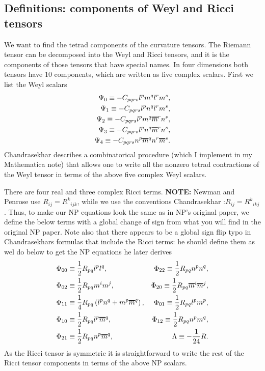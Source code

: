 \documentclass[12pt]{report}
\newcommand*\oline[1]{%
   \vbox{%
     \hrule height 1pt%
     \kern0.25ex%
     \hbox{%
       \ifmmode#1\else\ensuremath{#1}\fi%
     }
   }
}
\begin{document}
\subsection{Definitions: components of Weyl and Ricci tensors}
\label{sec:def_Weyl_Ricci_tensors}
	We want to find the tetrad components of the curvature tensors. The
Riemann tensor can be decomposed into the Weyl and Ricci tensors, and it
is the components of those tensors that have special names. In four dimensions
both tensors have 10 components, which are written as five complex scalars.
First we list the Weyl scalars 
\begin{align}
\begin{aligned}
	\Psi_0
	\equiv
	-C_{pqrs}l^pm^ql^rm^s
	, \\
	\Psi_1
	\equiv
	-C_{pqrs}l^pn^ql^rm^s
	, \\
	\Psi_2
	\equiv
	-C_{pqrs}l^pm^q\oline{m}^rn^s
	, \\
	\Psi_3
	\equiv
	-C_{pqrs}l^pn^q\oline{m}^rn^s
	, \\
	\Psi_4
	\equiv
	-C_{pqrs}n^p\oline{m}^qn^r\oline{m}^s
	.
\end{aligned}
\end{align} 
	Chandrasekhar \cite{Chandrasekhar_bh_book}
describes a combinatorical procedure
(which I implement in my Mathematica note) that allows one to
write all the nonzero tetrad contractions of the Weyl
tensor in terms of the above five complex Weyl scalars.

	There are four real and three complex
Ricci terms. {\bf NOTE:}
Newman and Penrose \cite{Newman_Penrose_paper} use
$R_{ij}=R^k{}_{ijk}$, while we use the conventions Chandrasekhar
\cite{Chandrasekhar_bh_book}:$R_{ij}=R^k{}_{ikj}$.
Thus, to make our NP equations
look the same as in NP's original paper, we define the below
terms with a global change of sign from what you
will find in the original NP paper.
Note also that there appears to be a global
sign flip typo in Chandrasekhars formulas that include the Ricci terms:
he should define them as wel do below to get the NP equations he later
derives
\begin{align}
\begin{aligned} 
	&
	\Phi_{00}
	\equiv
	\frac{1}{2}R_{pq}l^pl^q
	, &
	\Phi_{22}
	\equiv
	\frac{1}{2}R_{pq}n^pn^q
	, \\
	&
	\Phi_{02}
	\equiv
	\frac{1}{2}R_{pq}m^im^j
	, &
	\Phi_{20}
	\equiv
	\frac{1}{2}R_{pq}\oline{m}^i\oline{m}^j
	, \\
	&
	\Phi_{11}
	\equiv
	\frac{1}{4}R_{pq}\left(
		l^pn^q
	+	m^p\oline{m}^q
	\right)
	, &
	\Phi_{01}
	\equiv
	\frac{1}{2}R_{pq}l^pm^p
	, \\
	&
	\Phi_{10}
	\equiv
	\frac{1}{2}R_{pq}l^p\oline{m}^q
	, &
	\Phi_{12}
	\equiv
	\frac{1}{2}R_{pq}n^pm^q
	, \\
	&
	\Phi_{21}
	\equiv
	\frac{1}{2}R_{pq}n^p\oline{m}^q
	, & 
	\Lambda
	\equiv
	-\frac{1}{24}R
	.
\end{aligned}
\end{align} 
	As the Ricci tensor is symmetric it is straightforward to write
the rest of the Ricci tensor components in terms of the above NP scalars. 
\end{document}
